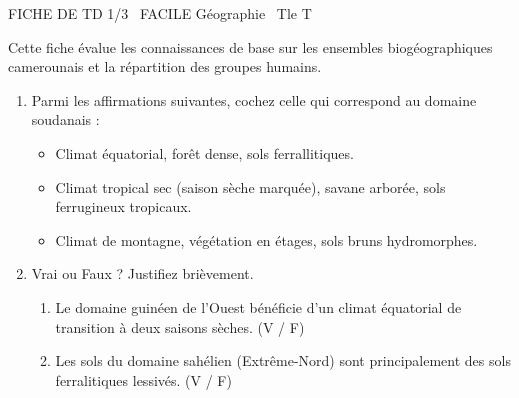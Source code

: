 \documentclass[11pt]{article}
\begin{document}
\begin{tcolorbox}[enhanced,colback=popink,colframe=popink,arc=10pt,boxrule=0pt,left=12pt,right=12pt,top=9pt,bottom=9pt]
{\color{white}\popxbold\small FICHE DE TD 1/3 \textbullet\ FACILE \hfill Géographie \textbullet\ Tle T\par}
\end{tcolorbox}
\vspace{4pt}
Cette fiche évalue les connaissances de base sur les ensembles biogéographiques camerounais et la répartition des groupes humains.

\begin{exercice}
\begin{enumerate}
    \item Parmi les affirmations suivantes, cochez celle qui correspond au domaine soudanais :
\begin{itemize}
        \item[$\square$] Climat équatorial, forêt dense, sols ferrallitiques.
        \item[$\square$] Climat tropical sec (saison sèche marquée), savane arborée, sols ferrugineux tropicaux.
        \item[$\square$] Climat de montagne, végétation en étages, sols bruns hydromorphes.
    \end{itemize}
    \item Vrai ou Faux ? Justifiez brièvement.
    \begin{enumerate}
        \item Le domaine guinéen de l'Ouest bénéficie d'un climat équatorial de transition à deux saisons sèches. \hfill (V / F)
        \item Les sols du domaine sahélien (Extrême-Nord) sont principalement des sols ferralitiques lessivés. \hfill (V / F)
    \end{enumerate}
\end{enumerate}
\end{exercice}
\end{document}
